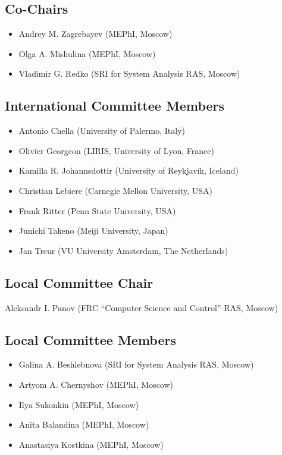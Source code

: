 \documentclass[10pt,fleqn,openany]{book} %
\begin{document}
\subsection{Co-Chairs}
	\begin{itemize}
		\item Andrey M. Zagrebayev (MEPhI, Moscow)
		\item Olga A. Mishulina (MEPhI, Moscow)
		\item Vladimir G. Redko (SRI for System Analysis RAS, Moscow)
	\end{itemize}

\subsection{International Committee Members}
	\begin{itemize}
		\item Antonio Chella (University of Palermo, Italy)
		\item Olivier Georgeon (LIRIS, University of Lyon, France)
		\item Kamilla R. Johannsdottir (University of Reykjavík, Iceland)
		\item Christian Lebiere (Carnegie Mellon University, USA)
		\item Frank Ritter (Penn State University, USA)
		\item Junichi Takeno (Meiji University, Japan)
		\item Jan Treur (VU University Amsterdam, The Netherlands)
	\end{itemize}

\subsection{Local Committee Chair}
	Aleksandr I. Panov (FRC “Computer Science and Control” RAS, Moscow)
	
\subsection{Local Committee Members}
	\begin{multicols}{2}
		\begin{itemize}
			\item Galina A. Beshlebnova (SRI for System Analysis RAS, Moscow)
			\item Artyom A. Chernyshov (MEPhI, Moscow)
			\item Ilya Sukonkin (MEPhI, Moscow)
			\item Anita Balandina (MEPhI, Moscow)
			\item Anastasiya Kostkina (MEPhI, Moscow)
		\end{itemize}
	\end{multicols}
	
\end{document}
